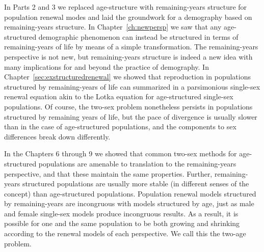 In Parts 2 and 3 we replaced age-structure with remaining-years structure
for population renewal modes and laid the groundwork for a demography
based on remaining-years structure. In Chapter~\ref{ch:newpersp} we saw that any
age-structured demographic phenomenon can instead be structured in terms of
remaining-years of life by means of a simple transformation. The
remaining-years perspective is not new, but remaining-years structure is indeed
a new idea with many implications for and beyond the practice of demography. In Chapter~\ref{sec:exstructuredrenewal} we showed that reproduction in
populations structured by remaining-years of life can
summarized in a parsimonious single-sex renewal equation akin to the Lotka
equation for age-structured single-sex populations. Of course, the two-sex
problem nonetheless persists in populations structured by remaining years of
life, but the pace of divergence is usually slower than in the case of
age-structured populations, and the components to sex differences break down
differently.

In the Chapters 6 through 9 we showed that common two-sex
methods for age-structured populations are amenable to translation
to the remaining-years perspective, and that these maintain the same properties.
Further, remaining-years structured populations are usually more stable (in
different senses of the concept) than age-structured populations. Population renewal models structured
by remaining-years are incongruous with models structured by age, just as male and 
female single-sex models produce incongruous results. As a result, it is
possible for one and the same population to be both growing and shrinking
according to the renewal models of each perspective. We call this the two-age problem.


